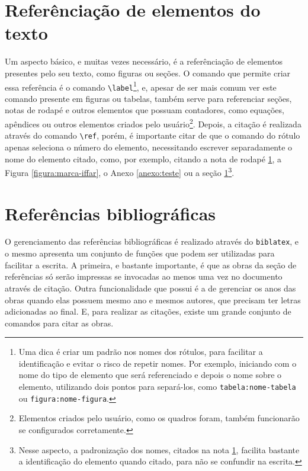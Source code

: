 \section{Referênciação de elementos do texto}\label{section:referencia}
Um aspecto básico, e muitas vezes necessário, é a referênciação de elementos presentes pelo seu texto, como figuras ou seções. O comando que permite criar essa referência é o comando \verb|\label|\footnote{\label{rodape:exemplo-ref}Uma dica é criar um padrão nos nomes dos rótulos, para facilitar a identificação e evitar o risco de repetir nomes. Por exemplo, iniciando com o nome do tipo de elemento que será referenciado e depois o nome sobre o elemento, utilizando dois pontos para separá-los, como \texttt{tabela:nome-tabela} ou \texttt{figura:nome-figura}.}, 
e, apesar de ser mais comum ver este comando presente em figuras ou tabelas, também serve para referenciar seções, notas de rodapé e outros elementos que possuam contadores, como equações, apêndices ou outros elementos criados pelo usuário\footnote{Elementos criados pelo usuário, como os quadros foram, também funcionarão se configurados corretamente.}. 
Depois, a citação é realizada através do comando \verb|\ref|, porém, é importante citar de que o comando do rótulo apenas seleciona o número do elemento, necessitando escrever separadamente o nome do elemento citado, como, por exemplo, citando a nota de rodapé \ref{rodape:exemplo-ref}, a Figura \ref{figura:marca-iffar}, o Anexo \ref{anexo:teste} ou a seção \ref{section:referencia}\footnote{Nesse aspecto, a padronização dos nomes, citados na nota \ref{rodape:exemplo-ref}, facilita bastante a identificação do elemento quando citado, para não se confundir na escrita.}. %

\section{Referências bibliográficas}
O gerenciamento das referências bibliográficas é realizado através do \verb|biblatex|, e o mesmo apresenta um conjunto de funções que podem ser utilizadas para facilitar a escrita. A primeira, e bastante importante, é que as obras da seção de referências só serão impressas se invocadas ao menos uma vez no documento através de citação. Outra funcionalidade que possui é a de gerenciar os anos das obras quando elas possuem mesmo ano e mesmos autores, que precisam ter letras adicionadas ao final. E, para realizar as citações, existe um grande conjunto de comandos para citar as obras.

